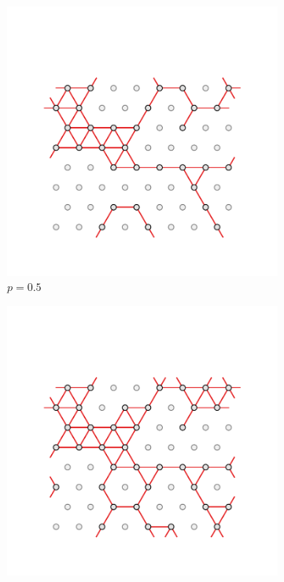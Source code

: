 \begin{figure}[bt]
     \vspace{0.2cm}
      \begin{subfigure}[b]{0.3\textwidth}
         \centering
         \includegraphics[width=\textwidth]{./figures/targeted_opt/perc_tri_5.pdf}
         \caption{$p=0.5$}
         \label{fig:perctri5}
     \end{subfigure}
     \hfill
      \begin{subfigure}[b]{0.3\textwidth}
         \centering
         \includegraphics[width=\textwidth]{./figures/targeted_opt/perc_tri_6.pdf}

\end{subfigure}
\end{figure}
